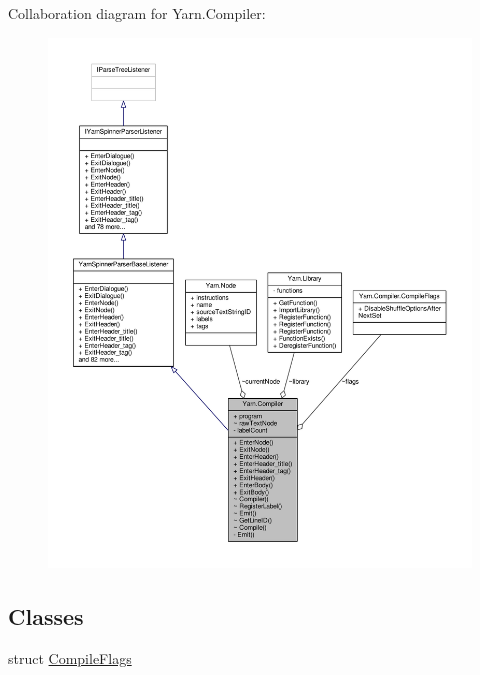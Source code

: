 Collaboration diagram for Yarn.\-Compiler\-:
\nopagebreak
\begin{figure}[H]
\begin{center}
\leavevmode
\includegraphics[width=350pt]{a00563}
\end{center}
\end{figure}
\subsection*{Classes}
\begin{DoxyCompactItemize}
\item 
struct \hyperlink{a00051_a00347}{Compile\-Flags}
\end{DoxyCompactItemize}
